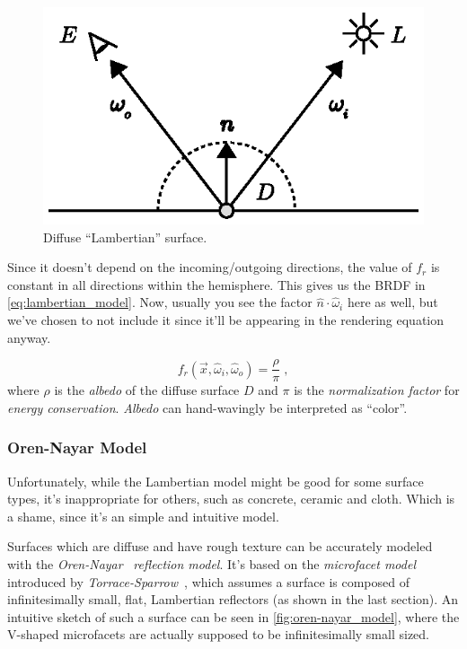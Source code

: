 \documentclass[a4paper, twocolumn]{article}
\begin{document}
                \begin{figure}[ht]
                    \centering
                    \includegraphics[width=0.8\linewidth]{share/lambertian_model.eps}
                    \caption{Diffuse ``Lambertian'' surface.}
                    \label{fig:lambertian_model}
                \end{figure}

                Since it doesn't depend on the incoming/outgoing directions, the value of \(f_r\) is constant in all directions within the hemisphere. This gives us the BRDF in \cref{eq:lambertian_model}. Now, usually you see the factor \(\hat{n} \cdot \hat{\omega}_i\) here as well, but we've chosen to not include it since it'll be appearing in the rendering equation anyway.

                \begin{equation} \label{eq:lambertian_model}
                    f_r(\vec{x}, \hat{\omega}_i, \hat{\omega}_o) = \frac{\rho}{\pi} \; ,
                \end{equation} where \(\rho\) is the \emph{albedo} of the diffuse surface \(D\) and \(\pi\) is the \emph{normalization factor} for \emph{energy conservation}. \emph{Albedo} can hand-wavingly be interpreted as ``color''.

            \subsubsection{Oren-Nayar Model} \label{sec:oren-nayar_model}

                Unfortunately, while the Lambertian model might be good for some surface types, it's inappropriate for others, such as concrete, ceramic and cloth. Which is a shame, since it's an simple and intuitive model.

                Surfaces which are diffuse and have rough texture can be accurately modeled with the \emph{Oren-Nayar}~\cite{oren1994generalization} \emph{reflection model}. It's based on the \emph{microfacet model} introduced by \emph{Torrace-Sparrow}~\cite{torrance1967theory}, which assumes a surface is composed of infinitesimally small, flat, Lambertian reflectors (as shown in the last section). An intuitive sketch of such a surface can be seen in \cref{fig:oren-nayar_model}, where the V-shaped microfacets are actually supposed to be infinitesimally small sized.
\end{document}
